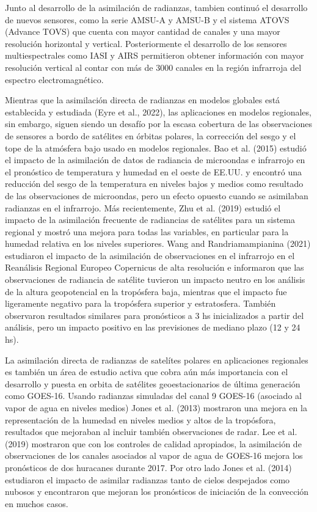 \documentclass[12pt,oneside,a4paper]{reedthesis}
\begin{document}
Junto al desarrollo de la asimilación de radianzas, tambien continuó el desarrollo de nuevos sensores, como la serie AMSU-A y AMSU-B y el sistema ATOVS (Advance TOVS) que cuenta con mayor cantidad de canales y una mayor resolución horizontal y vertical. Posteriormente el desarrollo de los sensores multiespectrales como IASI y AIRS permitieron obtener información con mayor resolución vertical al contar con más de 3000 canales en la región infrarroja del espectro electromagnético.

Mientras que la asimilación directa de radianzas en modelos globales está establecida y estudiada (Eyre et al., 2022), las aplicaciones en modelos regionales, sin embargo, siguen siendo un desafío por la escasa cobertura de las observaciones de sensores a bordo de satélites en órbitas polares, la corrección del sesgo y el tope de la atmósfera bajo usado en modelos regionales. Bao et al. (2015) estudió el impacto de la asimilación de datos de radiancia de microondas e infrarrojo en el pronóstico de temperatura y humedad en el oeste de EE.UU. y encontró una reducción del sesgo de la temperatura en niveles bajos y medios como resultado de las observaciones de microondas, pero un efecto opuesto cuando se asimilaban radianzas en el infrarrojo. Más recientemente, Zhu et al. (2019) estudió el impacto de la asimilación frecuente de radiancias de satélites para un sistema regional y mostró una mejora para todas las variables, en particular para la humedad relativa en los niveles superiores. Wang and Randriamampianina (2021) estudiaron el impacto de la asimilación de observaciones en el infrarrojo en el Reanálisis Regional Europeo Copernicus de alta resolución e informaron que las observaciones de radiancia de satélite tuvieron un impacto neutro en los análisis de la altura geopotencial en la tropósfera baja, mientras que el impacto fue ligeramente negativo para la tropósfera superior y estratosfera. También observaron resultados similares para pronósticos a 3 hs inicializados a partir del análisis, pero un impacto positivo en las previsiones de mediano plazo (12 y 24 hs).

La asimilación directa de radianzas de satelítes polares en aplicaciones regionales es también un área de estudio activa que cobra aún más importancia con el desarrollo y puesta en orbita de satélites geoestacionarios de última generación como GOES-16. Usando radianzas simuladas del canal 9 GOES-16 (asociado al vapor de agua en niveles medios) Jones et al. (2013) mostraron una mejora en la representación de la humedad en niveles medios y altos de la tropósfora, resultados que mejoraban al incluir también observaciones de radar. Lee et al. (2019) mostraron que con los controles de calidad apropiados, la asimilación de observaciones de los canales asociados al vapor de agua de GOES-16 mejora los pronósticos de dos huracanes durante 2017. Por otro lado Jones et al. (2014) estudiaron el impacto de asimilar radianzas tanto de cielos despejados como nubosos y encontraron que mejoran los pronósticos de iniciación de la convección en muchos casos.
\end{document}
